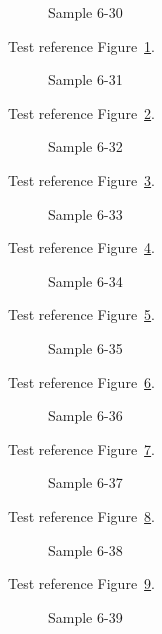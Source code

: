 \begin{figure}[tbhp]
\caption{Sample 6-30}
\label{fig:sample-6-30}
\end{figure}

Test reference Figure~\ref{fig:sample-6-30}.

\begin{figure}[tbhp]
\caption{Sample 6-31}
\label{fig:sample-6-31}
\end{figure}

Test reference Figure~\ref{fig:sample-6-31}.

\begin{figure}[tbhp]
\caption{Sample 6-32}
\label{fig:sample-6-32}
\end{figure}

Test reference Figure~\ref{fig:sample-6-32}.

\begin{figure}[tbhp]
\caption{Sample 6-33}
\label{fig:sample-6-33}
\end{figure}

Test reference Figure~\ref{fig:sample-6-33}.

\begin{figure}[tbhp]
\caption{Sample 6-34}
\label{fig:sample-6-34}
\end{figure}

Test reference Figure~\ref{fig:sample-6-34}.

\begin{figure}[tbhp]
\caption{Sample 6-35}
\label{fig:sample-6-35}
\end{figure}

Test reference Figure~\ref{fig:sample-6-35}.

\begin{figure}[tbhp]
\caption{Sample 6-36}
\label{fig:sample-6-36}
\end{figure}

Test reference Figure~\ref{fig:sample-6-36}.

\begin{figure}[tbhp]
\caption{Sample 6-37}
\label{fig:sample-6-37}
\end{figure}

Test reference Figure~\ref{fig:sample-6-37}.

\begin{figure}[tbhp]
\caption{Sample 6-38}
\label{fig:sample-6-38}
\end{figure}

Test reference Figure~\ref{fig:sample-6-38}.

\begin{figure}[tbhp]
\caption{Sample 6-39}
\label{fig:sample-6-39}
\end{figure}


